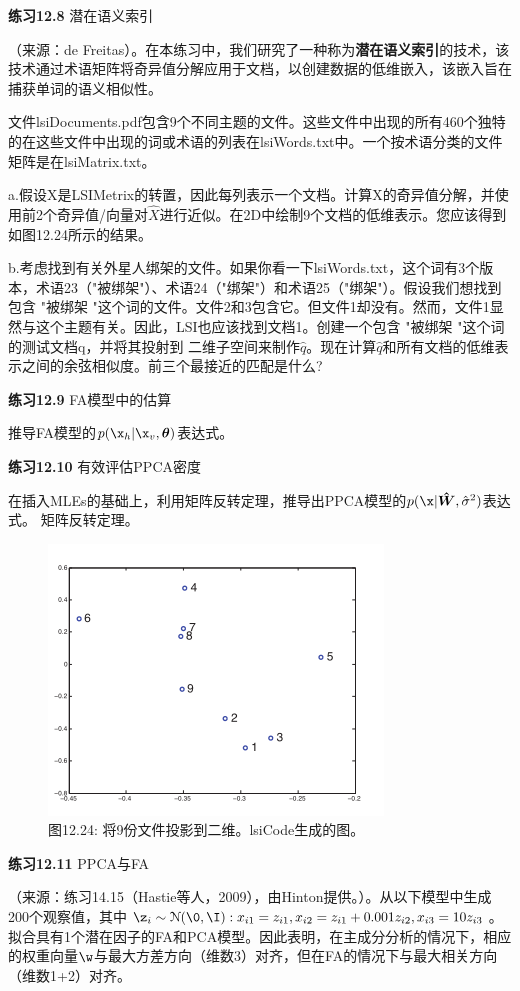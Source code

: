 \documentclass[a4paper]{article}
\begin{document}
\textbf{练习12.8} 潜在语义索引

（来源：de Freitas）。在本练习中，我们研究了一种称为\textbf{潜在语义索引}的技术，该技术通过术语矩阵将奇异值分解应用于文档，以创建数据的低维嵌入，该嵌入旨在捕获单词的语义相似性。 

文件lsiDocuments.pdf包含9个不同主题的文件。这些文件中出现的所有460个独特的在这些文件中出现的词或术语的列表在lsiWords.txt中。一个按术语分类的文件矩阵是在lsiMatrix.txt。 

a.假设X是LSIMetrix的转置，因此每列表示一个文档。计算X的奇异值分解，并使用前2个奇异值/向量对$\hat{X}$进行近似。在2D中绘制9个文档的低维表示。您应该得到如图12.24所示的结果。 

b.考虑找到有关外星人绑架的文件。如果你看一下lsiWords.txt，这个词有3个版本，术语23（"被绑架"）、术语24（"绑架"）和术语25（"绑架"）。假设我们想找到包含 "被绑架 "这个词的文件。文件2和3包含它。但文件1却没有。然而，文件1显然与这个主题有关。因此，LSI也应该找到文档1。创建一个包含 "被绑架 "这个词的测试文档q，并将其投射到
二维子空间来制作$\hat{q}$。现在计算$\hat{q}$和所有文档的低维表示之间的余弦相似度。前三个最接近的匹配是什么?

\textbf{练习12.9} FA模型中的估算

推导FA模型的$p(\x_h|\x_v,\boldsymbol{\theta})$表达式。

\textbf{练习12.10} 有效评估PPCA密度

在插入MLEs的基础上，利用矩阵反转定理，推导出PPCA模型的$p(\x|\boldsymbol{\hat{W}},\hat{\sigma}^2)$表达式。
矩阵反转定理。

\begin{figure}[h]
	\centering
	\includegraphics[width=0.4\linewidth]{fig/figure24}
	\caption*{图12.24: 将9份文件投影到二维。lsiCode生成的图。}
\end{figure}


\textbf{练习12.11} PPCA与FA

（来源：练习14.15（Hastie等人，2009），由Hinton提供。）。从以下模型中生成200个观察值，其中$\z_i \sim \mathcal{N}(\0,\I):x_{i1}=z_{i1},x_{i2}=z_{i1}+0.001z_{i2},x_{i3}=10z_{i3}$。拟合具有1个潜在因子的FA和PCA模型。因此表明，在主成分分析的情况下，相应的权重向量$\w$与最大方差方向（维数3）对齐，但在FA的情况下与最大相关方向（维数1+2）对齐。 
\end{document}

